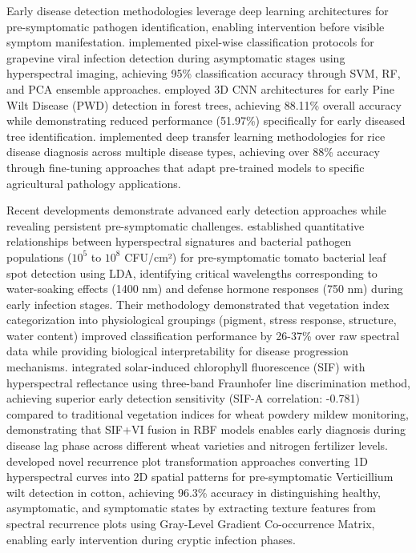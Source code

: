\documentclass[sn-mathphys]{sn-jnl}
\theoremstyle{thmstyleone}%
\theoremstyle{thmstyletwo}%
\theoremstyle{thmstylethree}%
\begin{document}
Early disease detection methodologies leverage deep learning architectures for pre-symptomatic pathogen identification, enabling intervention before visible symptom manifestation. \citet{nguyen2021early} implemented pixel-wise classification protocols for grapevine viral infection detection during asymptomatic stages using hyperspectral imaging, achieving 95\% classification accuracy through SVM, RF, and PCA ensemble approaches. \citet{yu2021three} employed 3D CNN architectures for early Pine Wilt Disease (PWD) detection in forest trees, achieving 88.11\% overall accuracy while demonstrating reduced performance (51.97\%) specifically for early diseased tree identification. \citet{feng2021hyperspectral} implemented deep transfer learning methodologies for rice disease diagnosis across multiple disease types, achieving over 88\% accuracy through fine-tuning approaches that adapt pre-trained models to specific agricultural pathology applications.

Recent developments demonstrate advanced early detection approaches while revealing persistent pre-symptomatic challenges. \citet{zhang2024hyperspectral} established quantitative relationships between hyperspectral signatures and bacterial pathogen populations ($10^5$ to $10^8$ CFU/cm²) for pre-symptomatic tomato bacterial leaf spot detection using LDA, identifying critical wavelengths corresponding to water-soaking effects (1400 nm) and defense hormone responses (750 nm) during early infection stages. Their methodology demonstrated that vegetation index categorization into physiological groupings (pigment, stress response, structure, water content) improved classification performance by 26-37\% over raw spectral data while providing biological interpretability for disease progression mechanisms. \citet{song2025early} integrated solar-induced chlorophyll fluorescence (SIF) with hyperspectral reflectance using three-band Fraunhofer line discrimination method, achieving superior early detection sensitivity (SIF-A correlation: -0.781) compared to traditional vegetation indices for wheat powdery mildew monitoring, demonstrating that SIF+VI fusion in RBF models enables early diagnosis during disease lag phase across different wheat varieties and nitrogen fertilizer levels. \citet{tan2025early} developed novel recurrence plot transformation approaches converting 1D hyperspectral curves into 2D spatial patterns for pre-symptomatic Verticillium wilt detection in cotton, achieving 96.3\% accuracy in distinguishing healthy, asymptomatic, and symptomatic states by extracting texture features from spectral recurrence plots using Gray-Level Gradient Co-occurrence Matrix, enabling early intervention during cryptic infection phases.
\end{document}
